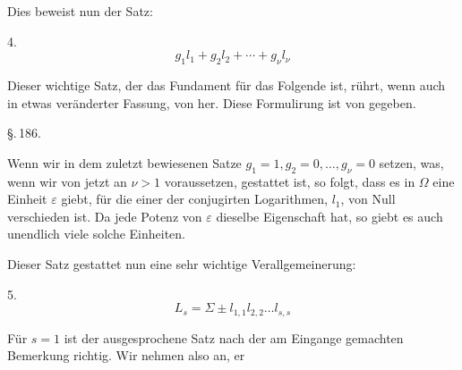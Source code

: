 Dies beweist nun der Satz:

4. 
\[
g_1 l_1 + g_2 l_2 + \cdots + g_\nu l_\nu
\]

Dieser wichtige Satz, der das Fundament f\"ur das Folgende ist, r\"uhrt, wenn auch in etwas ver\"anderter Fassung, von  her. Diese Formulirung ist von  gegeben.

\begin{center}
\S.\,186.\\
\end{center}

Wenn wir in dem zuletzt bewiesenen Satze $g_1 = 1, g_2 = 0, \ldots, g_\nu = 0$ setzen, was, wenn wir von jetzt an $\nu > 1$ voraussetzen, gestattet ist, so folgt, dass es in $\Omega$ eine Einheit $\varepsilon$ giebt, f\"ur die einer der conjugirten Logarithmen, $l_1$, von Null verschieden ist. Da jede Potenz von $\varepsilon$ dieselbe Eigenschaft hat, so giebt es auch unendlich viele solche Einheiten.

Dieser Satz gestattet nun eine sehr wichtige Verallgemeinerung:

5. 
\[
L_s = \Sigma \pm l_{1,1} l_{2,2} \ldots l_{s,s}
\]

F\"ur $s = 1$ ist der ausgesprochene Satz nach der am Eingange gemachten Bemerkung richtig. Wir nehmen also an, er
